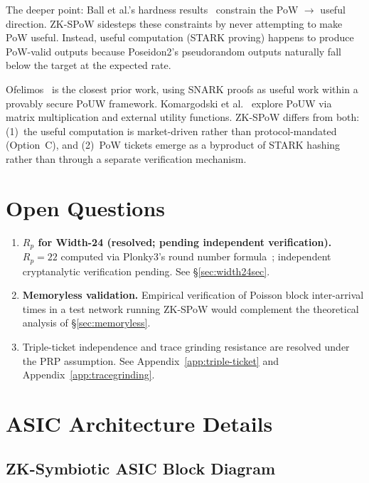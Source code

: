 \documentclass[11pt,a4paper]{article}
\begin{document}
The deeper point: Ball et al.'s hardness results~\cite{ball2017} constrain the PoW $\to$ useful direction. ZK-SPoW sidesteps these constraints by never attempting to make PoW useful. Instead, useful computation (STARK proving) happens to produce PoW-valid outputs because Poseidon2's pseudorandom outputs naturally fall below the target at the expected rate.

Ofelimos~\cite{ofelimos} is the closest prior work, using SNARK proofs as useful work within a provably secure PoUW framework. Komargodski et al.~\cite{komargodski2025,baron2025} explore PoUW via matrix multiplication and external utility functions. ZK-SPoW differs from both: (1)~the useful computation is market-driven rather than protocol-mandated (Option~C), and (2)~PoW tickets emerge as a byproduct of STARK hashing rather than through a separate verification mechanism.

\section{Open Questions}
\label{sec:open}

\begin{enumerate}
\item \textbf{$R_p$ for Width-24 (resolved; pending independent verification).} $R_p = 22$ computed via Plonky3's round number formula~\cite{plonky3}; independent cryptanalytic verification pending. See \S\ref{sec:width24sec}.

\item \textbf{Memoryless validation.} Empirical verification of Poisson block inter-arrival times in a test network running ZK-SPoW would complement the theoretical analysis of \S\ref{sec:memoryless}.

\item[\textbf{Resolved.}] Triple-ticket independence and trace grinding resistance are resolved under the PRP assumption. See Appendix~\ref{app:triple-ticket} and Appendix~\ref{app:tracegrinding}.
\end{enumerate}

\appendix

\section{ASIC Architecture Details}
\label{app:asic}

\subsection{ZK-Symbiotic ASIC Block Diagram}
\end{document}
